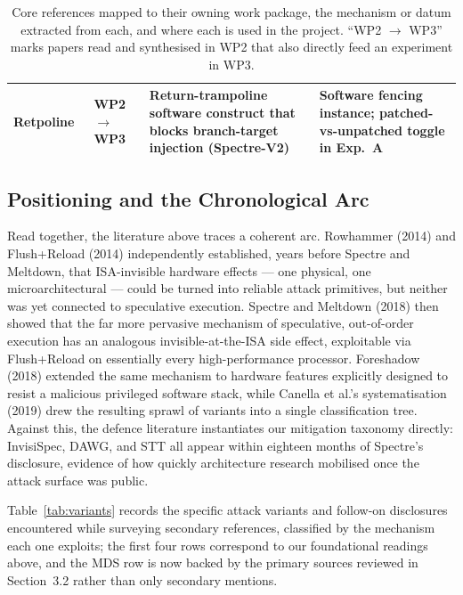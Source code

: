 \documentclass[11pt,a4paper]{article}
\begin{document}
\begin{table}[h]
\begin{tabular}{@{}p{3.3cm}p{1.2cm}p{4.3cm}p{4.1cm}@{}}
\addlinespace
Retpoline~\cite{turner2018retpoline} & WP2 $\to$ WP3 & Return-trampoline software construct that blocks branch-target injection (Spectre-V2) & Software fencing instance; patched-vs-unpatched toggle in Exp.\ A \\
\bottomrule
\end{tabular}
\caption{Core references mapped to their owning work package, the mechanism or
datum extracted from each, and where each is used in the project. ``WP2 $\to$
WP3'' marks papers read and synthesised in WP2 that also directly feed an
experiment in WP3.}
\label{tab:coremap}
\end{table}

\subsection{Positioning and the Chronological Arc}

Read together, the literature above traces a coherent arc. Rowhammer (2014)
and Flush+Reload (2014) independently established, years before Spectre and
Meltdown, that ISA-invisible hardware effects --- one physical, one
microarchitectural --- could be turned into reliable attack primitives, but
neither was yet connected to speculative execution. Spectre and Meltdown
(2018) then showed that the far more pervasive mechanism of speculative,
out-of-order execution has an analogous invisible-at-the-ISA side effect,
exploitable via Flush+Reload on essentially every high-performance processor.
Foreshadow (2018) extended the same mechanism to hardware features explicitly
designed to resist a malicious privileged software stack, while
Canella et al.'s systematisation (2019) drew the resulting sprawl of variants
into a single classification tree. Against this, the defence literature
instantiates our mitigation taxonomy directly: InvisiSpec, DAWG, and STT all
appear within eighteen months of Spectre's disclosure, evidence of how
quickly architecture research mobilised once the attack surface was public.

Table~\ref{tab:variants} records the specific attack variants and follow-on
disclosures encountered while surveying secondary references, classified by
the mechanism each one exploits; the first four rows correspond to our
foundational readings above, and the MDS row is now backed by the primary
sources reviewed in Section~3.2 rather than only secondary mentions.
\end{document}
